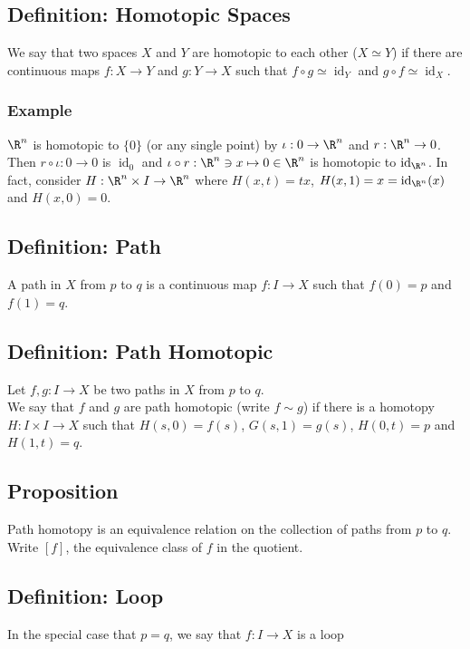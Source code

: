 \documentclass[11pt]{article}
\begin{document}
\subsection*{Definition: Homotopic Spaces}
\label{sec:orgd66ca0c}
We say that two spaces \(X\) and \(Y\) are homotopic to each other (\(X\simeq Y\)) if there are continuous maps \(f:X\to Y\) and \(g:Y\to X\) such that \(f\circ g\simeq\operatorname{id}_{Y}\) and \(g\circ f\simeq\operatorname{id}_{X}\).\\
\subsubsection*{Example}
\label{sec:org2d096de}
\(\R^{n}\) is homotopic to \(\{0\}\) (or any single point) by \(\iota:0\to\R^{n}\) and \(r:\R^{n}\to 0\). Then \(r\circ\iota:0\to 0\) is \(\operatorname{id}_{0}\) and \(\iota\circ r:\R^{n}\ni x\mapsto 0\in \R^{n}\) is homotopic to \(\operatorname{id}_{\R^{n}}\). In fact, consider \(H:\R^{n}\times I\to\R^{n}\) where \(H(x,t)=tx\), \(H(x,1)=x=\operatorname{id}_{\R^{n}}(x)\) and \(H(x,0)=0\).\\
\subsection*{Definition: Path}
\label{sec:org7d41851}
A path in \(X\) from \(p\) to \(q\) is a continuous map \(f:I\to X\) such that \(f(0)=p\) and \(f(1)=q\).\\
\subsection*{Definition: Path Homotopic}
\label{sec:org5527582}
Let \(f,g:I\to X\) be two paths in \(X\) from \(p\) to \(q\).\\
We say that \(f\) and \(g\) are path homotopic (write \(f\sim g\)) if there is a homotopy \(H:I\times I\to X\) such that \(H(s,0)=f(s)\), \(G(s,1)=g(s)\), \(H(0,t)=p\) and \(H(1,t)=q\).\\
\subsection*{Proposition}
\label{sec:orgb2ce404}
Path homotopy is an equivalence relation on the collection of paths from \(p\) to \(q\).\\
Write \([f]\), the equivalence class of \(f\) in the quotient.\\
\subsection*{Definition: Loop}
\label{sec:org818363b}
In the special case that \(p=q\), we say that \(f:I\to X\) is a loop\\
\end{document}
